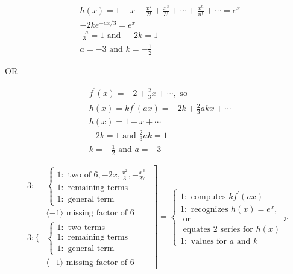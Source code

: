 \documentclass[12pt,addpoints,answers]{exam}
\begin{document}
\begin{questions}
\begin{solution}
\begin{parts}
\begin{align*}& h(x)=1+x+\frac{x^{2}}{2!}+\frac{x^{3}}{3!}+\cdots+\frac{x^{n}}{n!}+\cdots=e^{x} \\
& -2 k e^{-a x / 3}=e^{x} \\
& \frac{-a}{3}=1 \text { and }-2 k=1 \\
& a=-3 \text { and } k=-\frac{1}{2}\end{align*}

OR

\begin{align*}& f^{\prime}(x)=-2+\frac{2}{3} x+\cdots, \text { so } \\
& h(x)=k f^{\prime}(a x)=-2 k+\frac{2}{3} a k x+\cdots \\
& h(x)=1+x+\cdots \\
& -2 k=1 \text { and } \frac{2}{3} a k=1 \\
& k=-\frac{1}{2} \text { and } a=-3\end{align*}

\[\left.\begin{array}{rl}
3: & \left\{\begin{array}{l}
1: \text { two of } 6,-2 x, \frac{x^{2}}{3},-\frac{x^{3}}{27} \\
1: \text { remaining terms } \\
1: \text { general term }
\end{array}\right. \\
& \langle-1\rangle \text { missing factor of } 6 \\
3:\{ & \left\{\begin{array}{l}
1: \text { two terms } \\
1: \text { remaining terms } \\
1: \text { general term }
\end{array}\right. \\
& \langle-1\rangle \text { missing factor of } 6
\end{array}\right]=\left\{\begin{array}{c}
1: \text { computes } k f^{\prime}(a x) \\
1: \text { recognizes } h(x)=e^{x}, \\
\text { or } \\
\text { equates } 2 \text { series for } h(x) \\
1: \text { values for } a \text { and } k
\end{array}{ }_{3:}\right.\]
\end{parts}
\end{solution}

\end{questions}
\end{document}

